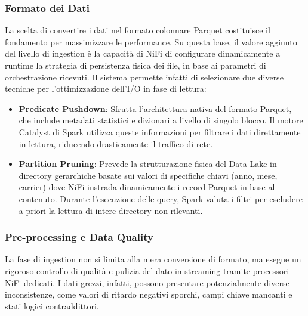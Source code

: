 \documentclass[conference]{IEEEtran}
\begin{document}
\subsubsection{Formato dei Dati}
La scelta di convertire i dati nel formato colonnare Parquet costituisce il fondamento per massimizzare le performance.
Su questa base, il valore aggiunto del livello di ingestion è la capacità di NiFi di configurare dinamicamente a runtime la strategia di persistenza fisica dei file, in base ai parametri di orchestrazione ricevuti.
Il sistema permette infatti di selezionare due diverse tecniche per l'ottimizzazione dell'I/O in fase di lettura:
\begin{itemize}
    \item \textbf{Predicate Pushdown}: Sfrutta l'architettura nativa del formato Parquet, che include metadati statistici e dizionari a livello di singolo blocco.
    Il motore Catalyst di Spark utilizza queste informazioni per filtrare i dati direttamente in lettura, riducendo drasticamente il traffico di rete.
    \item \textbf{Partition Pruning}: Prevede la strutturazione fisica del Data Lake in directory gerarchiche basate sui valori di specifiche chiavi (anno, mese, carrier) dove NiFi instrada dinamicamente i record Parquet in base al contenuto.
    Durante l'esecuzione delle query, Spark valuta i filtri per escludere a priori la lettura di intere directory non rilevanti.
\end{itemize}

\subsubsection{Pre-processing e Data Quality}
La fase di ingestion non si limita alla mera conversione di formato, ma esegue un rigoroso controllo di qualità e pulizia del dato in streaming tramite processori NiFi dedicati.
I dati grezzi, infatti, possono presentare potenzialmente diverse inconsistenze, come valori di ritardo negativi sporchi, campi chiave mancanti e stati logici contraddittori.
\end{document}
